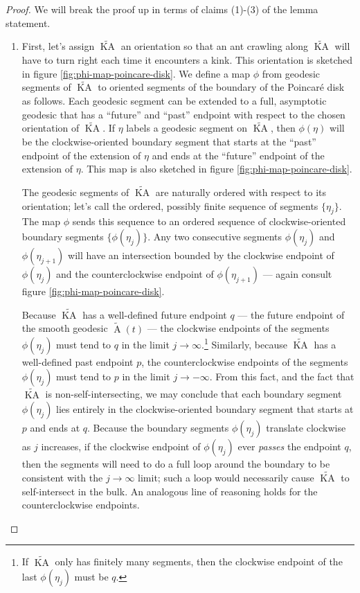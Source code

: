 \documentclass[a4paper,11pt]{article}
\renewcommand{\tilde}{\widetilde}
\newcommand{\KA}{\operatorname{KA}}
\newcommand{\A}{\operatorname{A}}
\begin{document}
\begin{proof}

    We will break the proof up in terms of claims (1)-(3) of the lemma statement.
    
    \begin{enumerate}[(1)]
        \item First, let's assign $\tilde{\KA}$ an orientation so that an ant crawling along $\tilde{\KA}$ will have to turn right each time it encounters a kink. This orientation is sketched in figure \ref{fig:phi-map-poincare-disk}. We define a map $\phi$ from geodesic segments of $\tilde{\KA}$ to oriented segments of the boundary of the Poincar\'{e} disk as follows. Each geodesic segment can be extended to a full, asymptotic geodesic that has a ``future'' and ``past'' endpoint with respect to the chosen orientation of $\tilde{\KA}.$ If $\eta$ labels a geodesic segment on $\tilde{\KA}$, then $\phi(\eta)$ will be the clockwise-oriented boundary segment that starts at the ``past'' endpoint of the extension of $\eta$ and ends at the ``future'' endpoint of the extension of $\eta$. This map is also sketched in figure \ref{fig:phi-map-poincare-disk}.
        
        The geodesic segments of $\tilde{\KA}$ are naturally ordered with respect to its orientation; let's call the ordered, possibly finite sequence of segments $\{\eta_j\}.$ The map $\phi$ sends this sequence to an ordered sequence of clockwise-oriented boundary segments $\{\phi(\eta_j)\}.$ Any two consecutive segments $\phi(\eta_j)$ and $\phi(\eta_{j+1})$ will have an intersection bounded by the clockwise endpoint of $\phi(\eta_j)$ and the counterclockwise endpoint of $\phi(\eta_{j+1})$ --- again consult figure \ref{fig:phi-map-poincare-disk}.
        
        Because $\tilde{\KA}$ has a well-defined future endpoint $q$ --- the future endpoint of the smooth geodesic $\tilde{\A}(t)$ --- the clockwise endpoints of the segments $\phi(\eta_j)$ must tend to $q$ in the limit $j \rightarrow \infty$.\footnote{If $\tilde{\KA}$ only has finitely many segments, then the clockwise endpoint of the last $\phi(\eta_j)$ must be $q$.} Similarly, because $\tilde{\KA}$ has a well-defined past endpoint $p$, the counterclockwise endpoints of the segments $\phi(\eta_j)$ must tend to $p$ in the limit $j \rightarrow -\infty$. From this fact, and the fact that $\tilde{\KA}$ is non-self-intersecting, we may conclude that each boundary segment $\phi(\eta_j)$ lies entirely in the clockwise-oriented boundary segment that starts at $p$ and ends at $q$. Because the boundary segments $\phi(\eta_j)$ translate clockwise as $j$ increases, if the clockwise endpoint of $\phi(\eta_j)$ ever \emph{passes} the endpoint $q$, then the segments will need to do a full loop around the boundary to be consistent with the $j\rightarrow \infty$ limit; such a loop would necessarily cause $\tilde{\KA}$ to self-intersect in the bulk. An analogous line of reasoning holds for the counterclockwise endpoints. 
        

\end{enumerate}
\end{proof}
\end{document}
